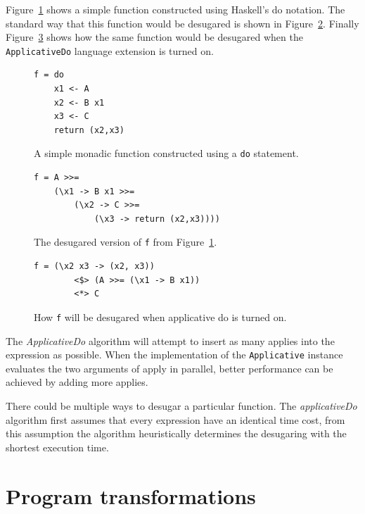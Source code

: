 Figure~\ref{doF} shows a simple function constructed using Haskell's do notation. The standard way that this function would be desugared is shown in Figure~\ref{fDesugar}. Finally Figure~\ref{fApDoDesugar} shows how the same function would be desugared when the \texttt{ApplicativeDo} language extension is turned on.

\begin{figure}[t]
\begin{lstlisting}
f = do
	x1 <- A
	x2 <- B x1
	x3 <- C
	return (x2,x3)
\end{lstlisting}
\caption{A simple monadic function constructed using a \texttt{do} statement.}
\label{doF}
\end{figure}

\begin{figure}[t]
\begin{lstlisting}
f = A >>=
	(\x1 -> B x1 >>=
		(\x2 -> C >>=
			(\x3 -> return (x2,x3))))
\end{lstlisting}
\caption{The desugared version of \texttt{f} from Figure~\ref{doF}.}
\label{fDesugar}
\end{figure}

\begin{figure}[t]
\begin{lstlisting}
f = (\x2 x3 -> (x2, x3))
        <$> (A >>= (\x1 -> B x1))
        <*> C                
\end{lstlisting}
\caption{How \texttt{f} will be desugared when applicative do is turned on.}
\label{fApDoDesugar}
\end{figure}

The \textit{ApplicativeDo} algorithm will attempt to insert as many applies into the expression as possible. When the implementation of the \texttt{Applicative} instance evaluates the two arguments of apply in parallel, better performance can be achieved by adding more applies. 

There could be multiple ways to desugar a particular function. The \textit{applicativeDo} algorithm first assumes that every expression have an identical time cost, from this assumption the algorithm heuristically determines the desugaring with the shortest execution time.


\section{Program transformations}\label{typeTrans}

